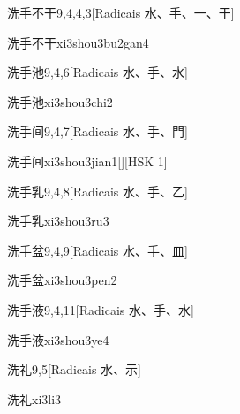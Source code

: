 \begin{entry}{洗手不干}{9,4,4,3}[Radicais ⽔、⼿、⼀、⼲]
  \begin{phonetics}{洗手不干}{xi3shou3bu2gan4}
  \end{phonetics}
\end{entry}

\begin{entry}{洗手池}{9,4,6}[Radicais ⽔、⼿、⽔]
  \begin{phonetics}{洗手池}{xi3shou3chi2}
  \end{phonetics}
\end{entry}

\begin{entry}{洗手间}{9,4,7}[Radicais ⽔、⼿、⾨]
  \begin{phonetics}{洗手间}{xi3shou3jian1}[][HSK 1]
  \end{phonetics}
\end{entry}

\begin{entry}{洗手乳}{9,4,8}[Radicais ⽔、⼿、⼄]
  \begin{phonetics}{洗手乳}{xi3shou3ru3}
  \end{phonetics}
\end{entry}

\begin{entry}{洗手盆}{9,4,9}[Radicais ⽔、⼿、⽫]
  \begin{phonetics}{洗手盆}{xi3shou3pen2}
  \end{phonetics}
\end{entry}

\begin{entry}{洗手液}{9,4,11}[Radicais ⽔、⼿、⽔]
  \begin{phonetics}{洗手液}{xi3shou3ye4}
  \end{phonetics}
\end{entry}

\begin{entry}{洗礼}{9,5}[Radicais ⽔、⽰]
  \begin{phonetics}{洗礼}{xi3li3}
  \end{phonetics}
\end{entry}

